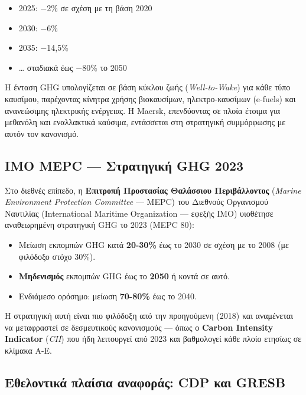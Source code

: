 \documentclass[11pt,a4paper,greek,twoside]{template-xe}
\providecommand{\tightlist}{\setlength{\itemsep}{0pt}\setlength{\parskip}{0pt}}
\begin{document}
\begin{itemize}
\tightlist
\item
  2025: −2\% σε σχέση με τη βάση 2020
\item
  2030: −6\%
\item
  2035: −14,5\%
\item
  \ldots{} σταδιακά έως −80\% το 2050
\end{itemize}

Η ένταση GHG υπολογίζεται σε βάση κύκλου ζωής (\emph{Well-to-Wake}) για
κάθε τύπο καυσίμου, παρέχοντας κίνητρα χρήσης βιοκαυσίμων,
ηλεκτρο-καυσίμων (e-fuels) και ανανεώσιμης ηλεκτρικής ενέργειας. Η
Maersk, επενδύοντας σε πλοία έτοιμα για μεθανόλη και εναλλακτικά
καύσιμα, εντάσσεται στη στρατηγική συμμόρφωσης με αυτόν τον κανονισμό.

\subsection{IMO MEPC --- Στρατηγική GHG
2023}\label{imo-mepc-ux3c3ux3c4ux3c1ux3b1ux3c4ux3b7ux3b3ux3b9ux3baux3ae-ghg-2023}

Στο διεθνές επίπεδο, η \textbf{Επιτροπή Προστασίας Θαλάσσιου
Περιβάλλοντος} (\emph{Marine Environment Protection Committee} --- MEPC)
του Διεθνούς Οργανισμού Ναυτιλίας (International Maritime Organization
--- εφεξής IMO) υιοθέτησε αναθεωρημένη στρατηγική GHG το 2023 (MEPC 80):

\begin{itemize}
\tightlist
\item
  Μείωση εκπομπών GHG κατά \textbf{20-30\%} έως το 2030 σε σχέση με το
  2008 (με φιλόδοξο στόχο 30\%).
\item
  \textbf{Μηδενισμός} εκπομπών GHG έως το \textbf{2050} ή κοντά σε αυτό.
\item
  Ενδιάμεσο ορόσημο: μείωση \textbf{70-80\%} έως το 2040.
\end{itemize}

Η στρατηγική αυτή είναι πιο φιλόδοξη από την προηγούμενη (2018) και
αναμένεται να μεταφραστεί σε δεσμευτικούς κανονισμούς --- όπως ο
\textbf{Carbon Intensity Indicator} (\emph{CII}) που ήδη λειτουργεί από
2023 και βαθμολογεί κάθε πλοίο ετησίως σε κλίμακα A-E.

\subsection{Εθελοντικά πλαίσια αναφοράς: CDP και
GRESB}\label{ux3b5ux3b8ux3b5ux3bbux3bfux3bdux3c4ux3b9ux3baux3ac-ux3c0ux3bbux3b1ux3afux3c3ux3b9ux3b1-ux3b1ux3bdux3b1ux3c6ux3bfux3c1ux3acux3c2-cdp-ux3baux3b1ux3b9-gresb}
\end{document}
